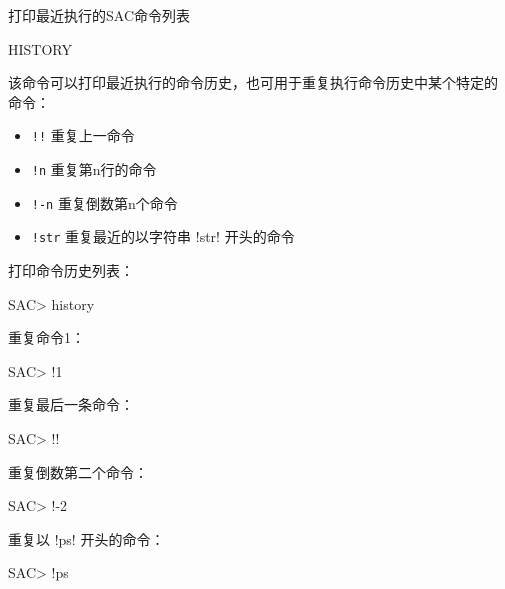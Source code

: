 \label{cmd:history}

打印最近执行的SAC命令列表

\begin{SACSTX}
HISTORY
\end{SACSTX}

该命令可以打印最近执行的命令历史，也可用于重复执行命令历史中某个特定的
命令：
\begin{itemize}
\item \verb|!!| 重复上一命令
\item \verb|!n| 重复第n行的命令
\item \verb|!-n| 重复倒数第n个命令
\item \verb|!str| 重复最近的以字符串 !str! 开头的命令
\end{itemize}

打印命令历史列表：
\begin{SACCode}
SAC> history
\end{SACCode}

重复命令1：
\begin{SACCode}
SAC> !1
\end{SACCode}

重复最后一条命令：
\begin{SACCode}
SAC> !!
\end{SACCode}

重复倒数第二个命令：
\begin{SACCode}
SAC> !-2
\end{SACCode}

重复以 !ps! 开头的命令：
\begin{SACCode}
SAC> !ps
\end{SACCode}
